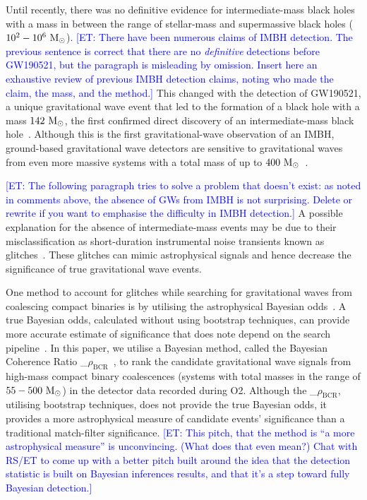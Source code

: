\documentclass[%
 nofootinbib,
 amsmath,amssymb,
 aps,
 twocolumn
]{revtex4-2}
\newcommand{\mathcmd}[1]{{\sc \relax\ifmmode#1\else $#1$\fi}\xspace}
\newcommand{\bcr}{\mathcmd{\rho_\text{BCR}}}
\newcommand{\msun}{\mathcmd{\text{M}_\odot}}
\newcommand{\et}[1]{\textcolor{blue}{[ET: #1]}}
\begin{document}
Until recently, there was no definitive evidence for intermediate-mass black holes with a mass in between the range of stellar-mass and supermassive black holes ($10^2-10^6\ \msun$). 
\et{There have been numerous claims of IMBH detection. The previous sentence is correct that there are no \textit{definitive} detections before GW190521, but the paragraph is misleading by omission. Insert here an exhaustive review of previous IMBH detection claims, noting who made the claim, the mass, and the method.}
This changed with the detection of GW190521, a unique gravitational wave event that led to the formation of a black hole with a mass  $142\ \msun$, the first confirmed direct discovery of an intermediate-mass black hole~\cite{gw190521}. Although this is the first gravitational-wave observation of an IMBH, ground-based gravitational wave detectors are sensitive to gravitational waves from even more massive systems with a total mass of up to $400\ \msun$~\cite{GWTC1}.

\et{The following paragraph tries to solve a problem that doesn't exist: as noted in comments above, the absence of GWs from IMBH is not surprising. Delete or rewrite if you want to emphasise the difficulty in IMBH detection.}
A possible explanation for the absence of intermediate-mass events may be due to their misclassification as short-duration instrumental noise transients known as glitches~\cite{ pycbc_short_duration_transients, pe_with_glitch, blip_glitches}. These glitches can mimic astrophysical signals and hence decrease the significance of true gravitational wave events. 

One method to account for glitches while searching for gravitational waves from coalescing compact binaries is by utilising the astrophysical Bayesian odds~\cite{bci, BCR1, BCR2, bcr_gw151216, bayesian_odds}. A true Bayesian odds, calculated without using bootstrap techniques, can provide more accurate estimate of significance that does note depend on the search pipeline~\cite{BCR2, bcr_gw151216,  bayesian_odds}.
In this paper, we utilise a Bayesian method, called the Bayesian Coherence Ratio \bcr~\cite{BCR1}, to rank the candidate gravitational wave signals from high-mass compact binary coalescences (systems with total masses in the range of $55-500\ \msun$) in the detector data recorded during O2. Although the \bcr, utilising bootstrap techniques, does not provide the true Bayesian odds, it provides a more astrophysical measure of candidate events' significance than a traditional match-filter significance.
\et{This pitch, that the method is ``a more astrophysical measure'' is unconvincing. (What does that even mean?) Chat with RS/ET to come up with a better pitch built around the idea that the detection statistic is built on Bayesian inferences results, and that it's a step toward fully Bayesian detection.}
\end{document}

